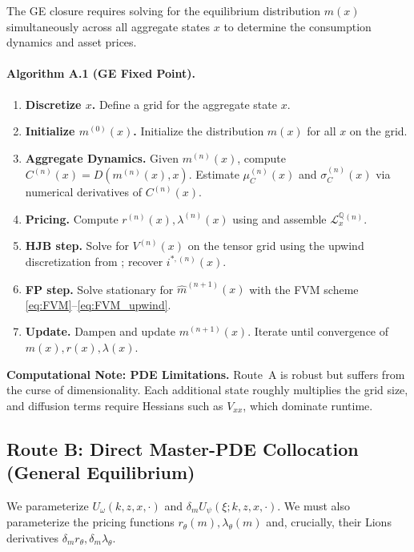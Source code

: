 \documentclass[11pt,letterpaper,oneside]{article}
\newcommand{\LxQ}{\mathcal{L}_x^{\mathbb{Q}}}
\newcommand{\dmU}{\delta_m U}
\begin{document}
The GE closure requires solving for the equilibrium distribution $m(x)$ simultaneously across all aggregate states $x$ to determine the consumption dynamics and asset prices.

\paragraph{Algorithm A.1 (GE Fixed Point).}
\begin{enumerate}[leftmargin=1.5em,label=\textbf{A.\arabic*}]
\item \textbf{Discretize $x$.} Define a grid for the aggregate state $x$.
\item \textbf{Initialize $m^{(0)}(x)$.} Initialize the distribution $m(x)$ for all $x$ on the grid.
\item \textbf{Aggregate Dynamics.} Given $m^{(n)}(x)$, compute $C^{(n)}(x)=D(m^{(n)}(x),x)$. Estimate $\mu_C^{(n)}(x)$ and $\sigma_C^{(n)}(x)$ via numerical derivatives of $C^{(n)}(x)$.
\item \textbf{Pricing.} Compute $r^{(n)}(x), \lambda^{(n)}(x)$ using  and assemble $\LxQ^{(n)}$.
\item \textbf{HJB step.} Solve  for $V^{(n)}(x)$ on the tensor grid using the upwind discretization from ; recover $i^{*,(n)}(x)$.
\item \textbf{FP step.} Solve stationary  for $\widehat m^{(n+1)}(x)$ with the FVM scheme \eqref{eq:FVM}--\eqref{eq:FVM_upwind}.
\item \textbf{Update.} Dampen and update $m^{(n+1)}(x)$. Iterate until convergence of $m(x), r(x), \lambda(x)$.
\end{enumerate}

\begin{tcolorbox}[didacticstyle]
\textbf{Computational Note: PDE Limitations.} Route~A is robust but suffers from the curse of dimensionality. Each additional state roughly multiplies the grid size, and diffusion terms require Hessians such as $V_{xx}$, which dominate runtime.
\end{tcolorbox}

\subsection{Route B: Direct Master-PDE Collocation (General Equilibrium)}\label{sec:routeB}

\begin{sloppypar}
We parameterize $U_\omega(k,z,x,\cdot)$ and $\dmU_\psi(\xi;k,z,x,\cdot)$. We must also parameterize the pricing functions $r_\theta(m), \lambda_\theta(m)$ and, crucially, their Lions derivatives $\delta_m r_\theta, \delta_m \lambda_\theta$.
\end{sloppypar}
\end{document}
